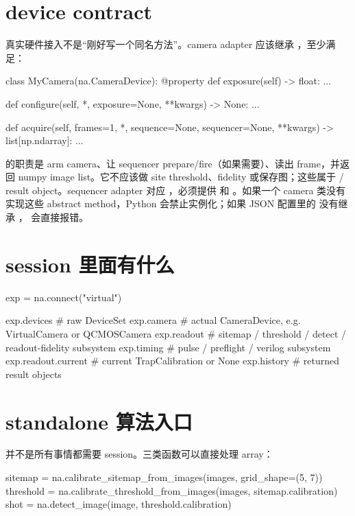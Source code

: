 \documentclass[11pt,oneside,openany]{book}
\begin{document}
\section{device contract}
真实硬件接入不是“刚好写一个同名方法”。camera adapter 应该继承 ，至少满足：
\begin{codeblock}[Python]
class MyCamera(na.CameraDevice):
    @property
    def exposure(self) -> float: ...

    def configure(self, *, exposure=None, **kwargs) -> None: ...

    def acquire(self, frames=1, *, sequence=None, sequencer=None, **kwargs) -> list[np.ndarray]: ...
\end{codeblock}

 的职责是 arm camera、让 sequencer prepare/fire（如果需要）、读出 frame，并返回 numpy image list。它不应该做 site threshold、fidelity 或保存图；这些属于  / result object。sequencer adapter 对应 ，必须提供  和 。如果一个 camera 类没有实现这些 abstract method，Python 会禁止实例化；如果 JSON 配置里的  没有继承 ， 会直接报错。

\section{session 里面有什么}
\begin{codeblock}[Python]
exp = na.connect("virtual")

exp.devices      # raw DeviceSet
exp.camera       # actual CameraDevice, e.g. VirtualCamera or QCMOSCamera
exp.readout      # sitemap / threshold / detect / readout-fidelity subsystem
exp.timing       # pulse / preflight / verilog subsystem
exp.readout.current  # current TrapCalibration or None
exp.history      # returned result objects
\end{codeblock}

\section{standalone 算法入口}
并不是所有事情都需要 session。三类函数可以直接处理 array：
\begin{codeblock}[Python]
sitemap = na.calibrate_sitemap_from_images(images, grid_shape=(5, 7))
threshold = na.calibrate_threshold_from_images(images, sitemap.calibration)
shot = na.detect_image(image, threshold.calibration)
\end{codeblock}
\end{document}
